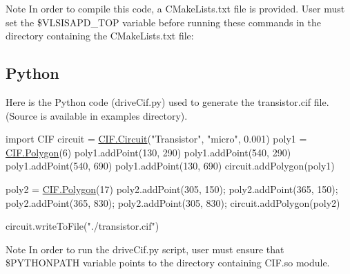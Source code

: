 \begin{DoxyNote}{Note}
In order to compile this code, a C\+Make\+Lists.\+txt file is provided. User must set the \$\+V\+L\+S\+I\+S\+A\+P\+D\+\_\+\+T\+OP variable before running these commands in the directory containing the C\+Make\+Lists.\+txt file\+: 
\begin{DoxyCode}
\end{DoxyCode}

\end{DoxyNote}
\hypertarget{cif_cifPython}{}\subsection{Python}\label{cif_cifPython}
Here is the Python code ({\ttfamily drive\+Cif.\+py}) used to generate the transistor.\+cif file. (Source is available in examples directory). 
\begin{DoxyCodeInclude}
\textcolor{keyword}{import} CIF
circuit = \mbox{\hyperlink{class_c_i_f_1_1_circuit}{CIF.Circuit}}(\textcolor{stringliteral}{"Transistor"}, \textcolor{stringliteral}{"micro"}, 0.001)
poly1 = \mbox{\hyperlink{class_c_i_f_1_1_polygon}{CIF.Polygon}}(6)
poly1.addPoint(130, 290)
poly1.addPoint(540, 290)
poly1.addPoint(540, 690)
poly1.addPoint(130, 690)
circuit.addPolygon(poly1)
    
poly2 = \mbox{\hyperlink{class_c_i_f_1_1_polygon}{CIF.Polygon}}(17)
poly2.addPoint(305, 150);
poly2.addPoint(365, 150);
poly2.addPoint(365, 830);
poly2.addPoint(305, 830);
circuit.addPolygon(poly2)

circuit.writeToFile(\textcolor{stringliteral}{"./transistor.cif"})
\end{DoxyCodeInclude}


\begin{DoxyNote}{Note}
In order to run the {\ttfamily drive\+Cif.\+py} script, user must ensure that \$\+P\+Y\+T\+H\+O\+N\+P\+A\+TH variable points to the directory containing C\+I\+F.\+so module. 
\end{DoxyNote}
